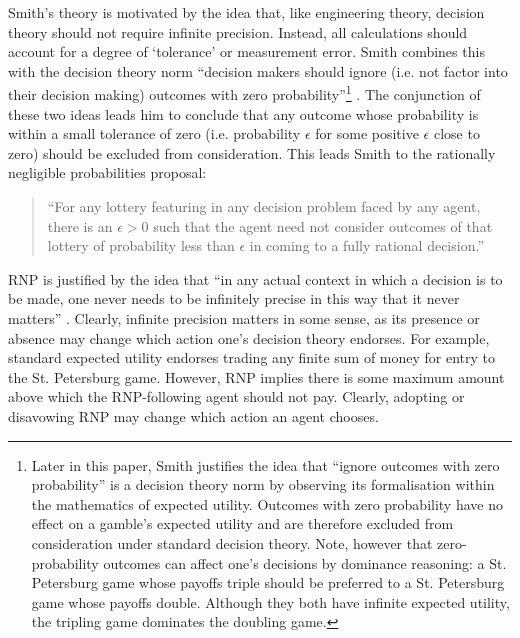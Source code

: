 \documentclass{article}
\begin{document}
Smith's theory is motivated by the idea that, like engineering theory, decision theory should not require infinite precision. Instead, all calculations should account for a degree of `tolerance' or measurement error. Smith combines this with the decision theory norm ``decision makers should ignore (i.e. not factor into their decision making) outcomes with zero probability''\footnote{Later in this paper, Smith justifies the idea that ``ignore outcomes with zero probability'' is a decision theory norm by observing its formalisation within the mathematics of expected utility. Outcomes with zero probability have no effect on a gamble's expected utility and are therefore excluded from consideration under standard decision theory. Note, however that zero-probability outcomes can affect one's decisions by dominance reasoning: a St. Petersburg game whose payoffs triple should be preferred to a St. Petersburg game whose payoffs double. Although they both have infinite expected utility, the tripling game dominates the doubling game.} \citep[pg. 472]{smith2014evaluative}. The conjunction of these two ideas leads him to conclude that any outcome whose probability is within a small tolerance of zero (i.e. probability \(\epsilon\) for some positive \(\epsilon\) close to zero) should be excluded from consideration. This leads Smith to the rationally negligible probabilities proposal:

\begin{quote}
``For any lottery featuring in any decision problem faced by any agent, there is an \(\epsilon > 0\) such that the agent need not consider outcomes of that lottery of probability less than \(\epsilon\) in coming to a fully rational decision.'' \citep[pg. 472]{smith2014evaluative}
\end{quote}

RNP is justified by the idea that ``in any actual context in which a decision is to be made, one never needs to be infinitely precise in this way \textemdash{} that it never matters'' \citep[pg. 474]{smith2014evaluative}. Clearly, infinite precision matters in some sense, as its presence or absence may change which action one's decision theory endorses. For example, standard expected utility endorses trading any finite sum of money for entry to the St. Petersburg game. However, RNP implies there is some maximum amount above which the RNP-following agent should not pay. Clearly, adopting or disavowing RNP may change which action an agent chooses.
\end{document}
